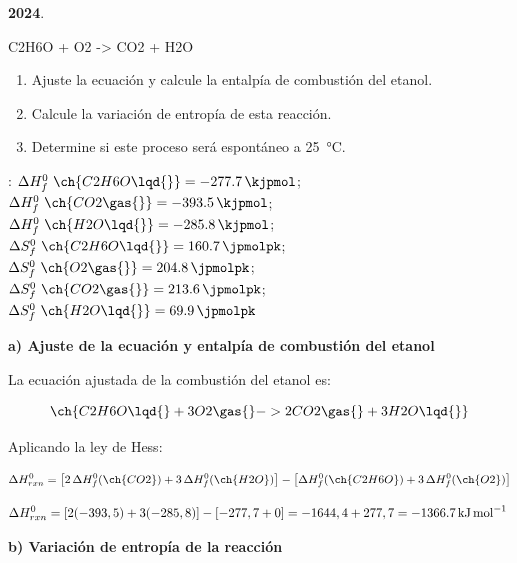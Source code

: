 \begin{exerciseEVAU}
    \textbf{2024}.
    \begin{reaction*}
        C2H6O \lqd{} + O2 \gas{} -> CO2 \gas{} + H2O \lqd{}
    \end{reaction*}

    \begin{enumerate}[label=\letraminuscula]
         \item Ajuste la ecuación y calcule la entalpía de combustión del etanol.
         \item Calcule la variación de entropía de esta reacción.
         \item Determine si este proceso será espontáneo a \SI{25}{\celsius}.
    \end{enumerate}

    \datos{}: \( \Delta H^0_f\  \ch{C2H6O \lqd{}} = \SI{-277.7}{\kjpmol}  \); \( \Delta H^0_f\ \ch{CO2 \gas{}} = \SI{-393.5}{\kjpmol} \); \( \Delta H^0_f\ \ch{H2O \lqd{}} = \SI{-285.8}{\kjpmol} \); \( \Delta S^0_f\ \ch{C2H6O \lqd{}} = \SI{160.7}{\jpmolpk} \); \( \Delta S^0_f\ \ch{O2 \gas{}} = \SI{204.8}{\jpmolpk} \); \( \Delta S^0_f\ \ch{CO2 \gas{}} = \SI{213.6}{\jpmolpk} \); \( \Delta S^0_f\ \ch{H2O \lqd{}} = \SI{69.9}{\jpmolpk} \)
    \begin{solu}

        \textbf{a) Ajuste de la ecuación y entalpía de combustión del etanol}

        La ecuación ajustada de la combustión del etanol es:

        \begin{equation*}
            \ch{C2H6O \lqd{} + 3 O2 \gas{} -> 2 CO2 \gas{} + 3 H2O \lqd{}}
        \end{equation*}

        Aplicando la ley de Hess:

        \begin{equation*}
            \Delta H^0_{rxn} = \left[ 2\, \Delta H^0_f (\ch{CO2}) + 3\, \Delta H^0_f (\ch{H2O}) \right] - \left[ \Delta H^0_f (\ch{C2H6O}) + 3\, \Delta H^0_f (\ch{O2}) \right]
        \end{equation*}

        \begin{equation*}
            \Delta H^0_{rxn} = \left[ 2(-393,5) + 3(-285,8) \right] - \left[ -277,7 + 0 \right] = -1644,4 + 277,7 = \energia[kjmol]{-1366.7}
        \end{equation*}

        \textbf{b) Variación de entropía de la reacción}


\end{solu}
\end{exerciseEVAU}
